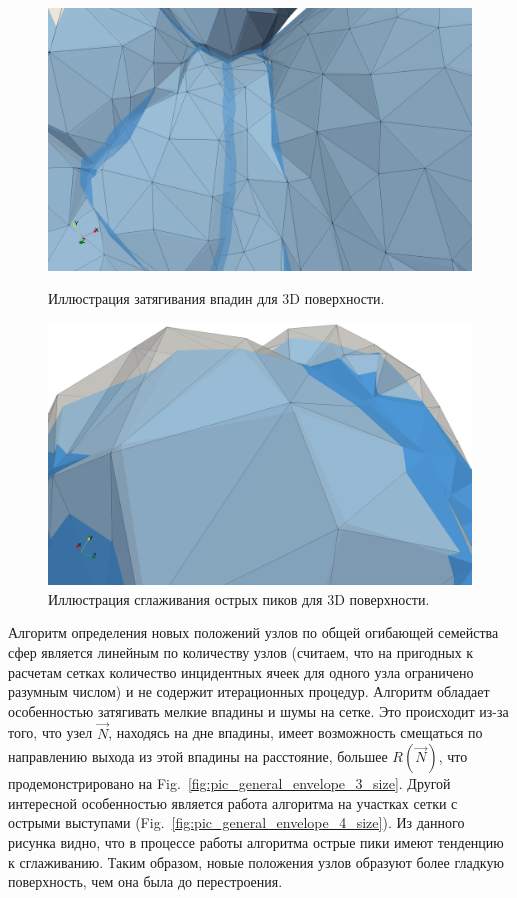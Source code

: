\documentclass[
11pt,%
tightenlines,%
twoside,%
onecolumn,%
nofloats,%
nobibnotes,%
nofootinbib,%
superscriptaddress,%
noshowpacs,%
centertags]%
{revtex4}
\begin{document}
\begin{figure}[h]
  \centering
  \begin{minipage}[h]{0.49\textwidth}
    \includegraphics[width=\textwidth]{pics/pic_envelope_cave.png}
    \caption{Иллюстрация затягивания впадин для 3D поверхности.}\label{fig:pic_general_envelope_cave}
  \end{minipage}
  \hfill
  \begin{minipage}[h]{0.49\textwidth}
    \includegraphics[width=\textwidth]{pics/pic_envelope_peak.png}
    \caption{Иллюстрация сглаживания острых пиков для 3D поверхности.}\label{fig:pic_envelope_peak}
  \end{minipage}
\end{figure}

Алгоритм определения новых положений узлов по общей огибающей семейства сфер является линейным по количеству узлов (считаем, что на пригодных к расчетам сетках количество инцидентных ячеек для одного узла ограничено разумным числом) и не содержит итерационных процедур.
Алгоритм обладает особенностью затягивать мелкие впадины и шумы на сетке.
Это происходит из-за того, что узел $\vec{N}$, находясь на дне впадины, имеет возможность смещаться по направлению выхода из этой впадины на расстояние, большее $R(\vec{N})$, что продемонстрировано на Fig.~\ref{fig:pic_general_envelope_3_size}.
Другой интересной особенностью является работа алгоритма на участках сетки с острыми выступами (Fig.~\ref{fig:pic_general_envelope_4_size}).
Из данного рисунка видно, что в процессе работы алгоритма острые пики имеют тенденцию к сглаживанию. 
Таким образом, новые положения узлов образуют более гладкую поверхность, чем она была до перестроения.
\end{document}
